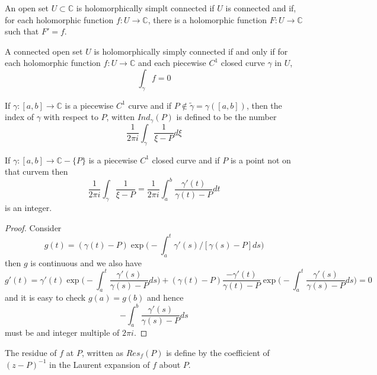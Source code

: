 \documentclass[lang=en, color=blue, ]{elegantbook}
\newcommand{\C}{\mathbb{C}}
\begin{document}
\begin{definition}
    An open set $U\subset \C$ is holomorphically simplt connected if $U$ is connected and if, for each holomorphic function $f:U\to\C$, there is a holomorphic function $F:U\to\C$ such that $F'=f$.
\end{definition}

\begin{lemma}
    A connected open set $U$ is holomorphically simply connected if and only if for each holomorphic function $f:U\to\C$ and each piecewise $C^1$ closed curve $\gamma$ in $U$,
    \[
    \int_{\gamma} f = 0
    \]
\end{lemma}

\begin{definition}
    If $\gamma:[a,b]\to\C$ is a piecewise $C^1$ curve and if $P\notin \tilde{\gamma} = \gamma([a,b])$, then the index of $\gamma$ with respect to $P$, witten $Ind_{\gamma}(P)$ is defined to be the number
    \[\dfrac{1}{2\pi i}\int_{\gamma}\dfrac{1}{\xi-P}d\xi\]
\end{definition}

\begin{lemma}
    If $\gamma:[a,b]\to\C-\{P\}$ is a piecewise $C^1$ closed curve and if $P$ is a point not on that curvem then
    \[
    \dfrac{1}{2\pi i }\int_{\gamma}\dfrac{1}{\xi-P} = \dfrac{1}{2\pi i}\int_a^b\dfrac{\gamma'(t)}{\gamma(t)-P}dt
    \]
    is an integer.
\end{lemma}
\begin{proof}\par
    Consider
    \[
    g(t) = (\gamma(t)-P)\exp{\Big(-\int_a^t\gamma'(s)/[\gamma(s)-P]ds\Big)} 
    \]
    then $g$ is continuous and we also have
    \[
    g'(t) = \gamma'(t)\exp{\Big(-\int_a^t \dfrac{\gamma'(s)}{\gamma(s)-P}ds\Big)} + (\gamma(t)-P)\dfrac{-\gamma'(t)}{\gamma(t)-P}\exp{\Big(-\int_a^t\dfrac{\gamma'(s)}{\gamma(s)-P}ds\Big)} = 0
    \]
    and it is easy to check $g(a) = g(b)$ and hence
    \[
    -\int_a^b \dfrac{\gamma'(s)}{\gamma(s)-P}ds
    \]
    must be and integer multiple of $2\pi i$.
\end{proof}

\begin{definition}
    The residue of $f$ at $P$, written as $Res_f(P)$ is define by the coefficient of $(z-P)^{-1}$ in the Laurent expansion of $f$ about $P$.
\end{definition}
\end{document}
